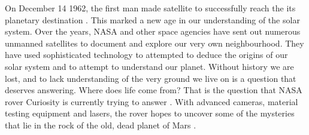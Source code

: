 \documentclass[a4paper,12pt]{article}
\begin{document}
On December 14 1962, the first man made satellite to successfully reach the its planetary destination \autocite{david2012}. This marked a new age in our understanding of the solar system. Over the years, NASA and other space agencies have sent out numerous unmanned satellites to document and explore our very own neighbourhood. They have used sophisticated technology to attempted to deduce the origins of our solar system and to attempt to understand our planet. Without history we are lost, and to lack understanding of the very ground we live on is a question that deserves answering. Where does life come from? That is the question that NASA rover Curiosity is currently trying to answer \autocite{gross2012}. With advanced cameras, material testing equipment and lasers, the rover hopes to uncover some of the mysteries that lie in the rock of the old, dead planet of Mars \autocite{gross2012}.

\newpage
\printbibliography
\end{document}
